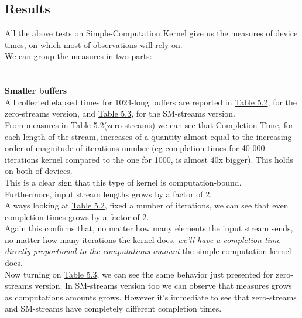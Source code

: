 \subsection{Results}
All the above tests on Simple-Computation Kernel give us the measures of device times, on which most of observations will rely on.\\
We can group the measures in two parts:\\\\\\
	{\large \textbf{Smaller buffers}}\\
	All collected elapsed times for 1024-long buffers are reported in \hyperref[tab:cosavgszero]{Table 5.2}, for the zero-streams version, and \hyperref[tab:cosavgsSM]{Table 5.3}, for the SM-streams version.\\
	From measures in \hyperref[tab:cosavgszero]{Table 5.2}(zero-streams) we can see that Completion Time, for each length of the stream, increases of a quantity almost equal to the increasing order of magnitude of  iterations number (eg completion times for 40 000 iterations kernel compared to the one for 1000, is almost 40x bigger). This holds on both of devices.\\
	This is a clear sign that this type of kernel is computation-bound.\\
	Furthermore, input stream lengths grows by a factor of 2.\\ Always looking at  \hyperref[tab:cosavgszero]{Table 5.2}, fixed a number of iterations, we can see that even completion times grows by a factor of 2.\\
	Again this confirms that, no matter how many elements the input stream sends, no matter how many iterations the kernel does, \textit{we'll have a completion time directly proportional to the computations amount} the simple-computation kernel does.\\
	
	Now turning on \hyperref[tab:cosavgsSM]{Table 5.3}, we can see the same behavior just presented for zero-streams version. In SM-streams version too we can observe that measures grows as computations amounts grows. However it's immediate to see that zero-streams and SM-streams have completely different completion times.
			
